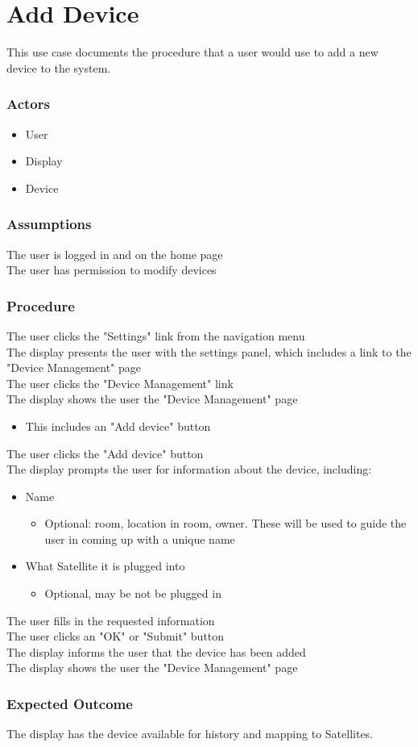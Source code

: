 \section{Add Device}

This use case documents the procedure that a user would use to add a new device to the system. 

\subsubsection{Actors}
\begin{itemize}
	\item User
	\item Display
	\item Device
\end{itemize}

\subsubsection{Assumptions}

The user is logged in and on the home page\\
The user has permission to modify devices

\subsubsection{Procedure}

The user clicks the "Settings" link from the navigation menu\\
The display presents the user with the settings panel, which includes a link to the "Device Management" page\\
The user clicks the "Device Management" link\\
The display shows the user the "Device Management" page
\begin{itemize}
	\item This includes an "Add device" button
\end{itemize}
The user clicks the "Add device" button\\
The display prompts the user for information about the device, including:
\begin{itemize}
	\item Name
	\begin{itemize}
		\item Optional: room, location in room, owner. These will be used to guide the user in coming up with a unique name
	\end{itemize}
	\item What Satellite it is plugged into
	\begin{itemize}
		\item Optional, may be not be plugged in
	\end{itemize}
\end{itemize}
The user fills in the requested information\\
The user clicks an "OK" or "Submit" button\\
The display informs the user that the device has been added\\
The display shows the user the "Device Management" page

\subsubsection{Expected Outcome}

The display has the device available for history and mapping to Satellites. 
